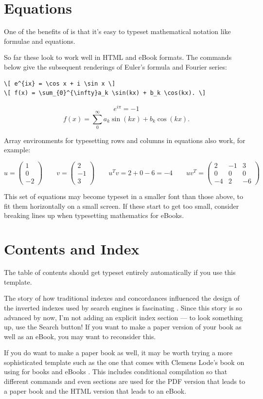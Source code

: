 \section{Equations}

One of the benefits of \latex is that it's easy to typeset mathematical notation like formulae and equations.

So far these look to work well in HTML and eBook formats. The commands below give the subsequent
renderings of Euler's formula and Fourier series:

\begin{verbatim}
\[ e^{ix} = \cos x + i \sin x \]
\[ f(x) = \sum_{0}^{\infty}a_k \sin(kx) + b_k \cos(kx). \]
\end{verbatim}

\[ e^{i\pi} = -1 \]
\[ f(x) = \sum_{0}^{\infty}a_k \sin(kx) + b_k \cos(kx). \]

Array environments for typesetting rows and columns in equations also work, for example:

\[
u = \left( \begin{array}{c} 1 \\ 0 \\ -2 \end{array} \right) \qquad
v = \left( \begin{array}{c} 2 \\ -1 \\ 3 \end{array} \right) \qquad
u^T v = 2 + 0 - 6 = -4 \qquad
u v^T = \left( \begin{array}{ccc} 2 & -1 & 3 \\ 0 & 0 & 0 \\ -4 & 2 & -6 \end{array} \right)
\]

This set of equations may become typeset in a smaller font than those above, to fit them
horizontally on a small screen. If these start to get too small, consider breaking lines up
when typesetting mathematics for eBooks.

\section{Contents and Index}

The table of contents should get typeset entirely automatically if you use this template.

The story of how traditional indexes and concordances influenced the design of the inverted
indexes used by search engines is fascinating \citep[Ch 1]{witten1999gigabytes}.
Since this story is so advanced by now, I'm not adding an explicit index section ---
to look something up, use the Search button! If you want to make a paper
version of your book as well as an eBook, you may want to reconsider this.

If you do want to make a paper book as well, it may be worth trying a
more sophisticated template such as the one that comes with Clemens
Lode's book on using \latex for books and eBooks \citep{lode2019better}.
This includes conditional compilation so that different commands and even sections are used
for the PDF version that leads to a paper book and the HTML version that leads to an eBook.